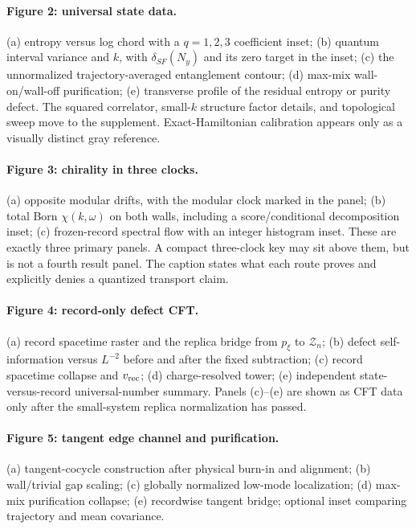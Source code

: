 \documentclass[aps,prx,onecolumn,nofootinbib,superscriptaddress,longbibliography]{revtex4-2}
\begin{document}
\paragraph{Figure 2: universal state data.}
(a) entropy versus log chord with a $q=1,2,3$ coefficient inset; (b) quantum interval
variance and $k$, with $\delta_{SF}(N_y)$ and its zero target in the inset; (c) the
unnormalized trajectory-averaged entanglement contour; (d)
max-mix wall-on/wall-off purification; (e) transverse profile of the residual entropy or
purity defect.  The squared correlator, small-$k$ structure factor details, and topological
sweep move to the supplement.  Exact-Hamiltonian calibration appears only as a visually
distinct gray reference.

\paragraph{Figure 3: chirality in three clocks.}
(a) opposite modular drifts, with the modular clock marked in the panel; (b) total Born
$\chi(k,\omega)$ on both walls, including a score/conditional decomposition inset; (c)
frozen-record spectral flow with an integer histogram inset.  These are exactly three
primary panels.  A compact three-clock key may sit above them, but is not a fourth result
panel.  The caption states what each route proves and explicitly denies a quantized
transport claim.

\paragraph{Figure 4: record-only defect CFT.}
(a) record spacetime raster and the replica bridge from $p_\xi$ to $\mathcal Z_n$;
(b) defect self-information versus $L^{-2}$ before and after the fixed subtraction;
(c) record spacetime collapse and $v_{\rm rec}$; (d) charge-resolved tower; (e)
independent state-versus-record universal-number summary.  Panels (c)--(e) are shown as CFT
data only after the small-system replica normalization has passed.

\paragraph{Figure 5: tangent edge channel and purification.}
(a) tangent-cocycle construction after physical burn-in and alignment; (b) wall/trivial gap
scaling; (c) globally normalized low-mode localization; (d) max-mix purification collapse;
(e) recordwise tangent bridge; optional inset comparing trajectory and mean covariance.
\end{document}
